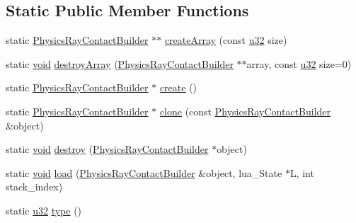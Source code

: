 \subsection*{Static Public Member Functions}
\begin{DoxyCompactItemize}
\item 
static \mbox{\hyperlink{classnjli_1_1_physics_ray_contact_builder}{Physics\+Ray\+Contact\+Builder}} $\ast$$\ast$ \mbox{\hyperlink{classnjli_1_1_physics_ray_contact_builder_a9ba1430a1963afc623987d50200c616d}{create\+Array}} (const \mbox{\hyperlink{_util_8h_a10e94b422ef0c20dcdec20d31a1f5049}{u32}} size)
\item 
static \mbox{\hyperlink{_thread_8h_af1e856da2e658414cb2456cb6f7ebc66}{void}} \mbox{\hyperlink{classnjli_1_1_physics_ray_contact_builder_ac2940123b0ac1ad19d09278453d55bff}{destroy\+Array}} (\mbox{\hyperlink{classnjli_1_1_physics_ray_contact_builder}{Physics\+Ray\+Contact\+Builder}} $\ast$$\ast$array, const \mbox{\hyperlink{_util_8h_a10e94b422ef0c20dcdec20d31a1f5049}{u32}} size=0)
\item 
static \mbox{\hyperlink{classnjli_1_1_physics_ray_contact_builder}{Physics\+Ray\+Contact\+Builder}} $\ast$ \mbox{\hyperlink{classnjli_1_1_physics_ray_contact_builder_aaee5c3ad4954040fedd568fd118e553e}{create}} ()
\item 
static \mbox{\hyperlink{classnjli_1_1_physics_ray_contact_builder}{Physics\+Ray\+Contact\+Builder}} $\ast$ \mbox{\hyperlink{classnjli_1_1_physics_ray_contact_builder_afb36a78aa3fea0526e46c44e7eca0e42}{clone}} (const \mbox{\hyperlink{classnjli_1_1_physics_ray_contact_builder}{Physics\+Ray\+Contact\+Builder}} \&object)
\item 
static \mbox{\hyperlink{_thread_8h_af1e856da2e658414cb2456cb6f7ebc66}{void}} \mbox{\hyperlink{classnjli_1_1_physics_ray_contact_builder_ac398ac93035c6ad5eda3abf5fc242813}{destroy}} (\mbox{\hyperlink{classnjli_1_1_physics_ray_contact_builder}{Physics\+Ray\+Contact\+Builder}} $\ast$object)
\item 
static \mbox{\hyperlink{_thread_8h_af1e856da2e658414cb2456cb6f7ebc66}{void}} \mbox{\hyperlink{classnjli_1_1_physics_ray_contact_builder_a512a9df934c2b61abeba6394f697699d}{load}} (\mbox{\hyperlink{classnjli_1_1_physics_ray_contact_builder}{Physics\+Ray\+Contact\+Builder}} \&object, lua\+\_\+\+State $\ast$L, int stack\+\_\+index)
\item 
static \mbox{\hyperlink{_util_8h_a10e94b422ef0c20dcdec20d31a1f5049}{u32}} \mbox{\hyperlink{classnjli_1_1_physics_ray_contact_builder_aa6edc3d5013e98be7572fd4e8d1d1af4}{type}} ()
\end{DoxyCompactItemize}
